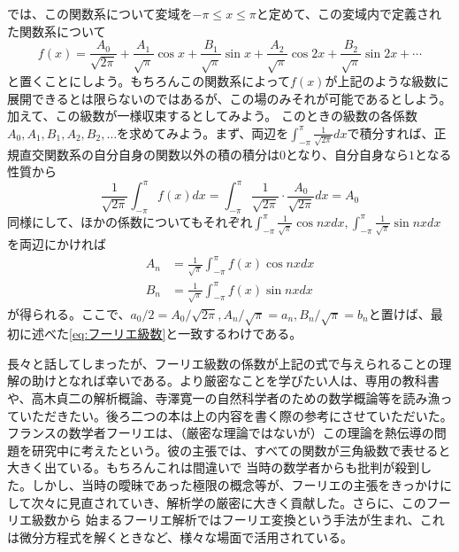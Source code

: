\documentclass[a4j,dvipdfmx]{jsarticle}
\begin{document}
                では、この関数系について変域を$-\pi\leq x\leq \pi$と定めて、この変域内で定義された関数系について
                \begin{equation*}
                    f(x)=\frac{A_0}{\sqrt{2\pi}}+\frac{A_1}{\sqrt{\pi}}\cos x+\frac{B_1}{\sqrt{\pi}}\sin x+\frac{A_2}{\sqrt{\pi}}\cos 2x+\frac{B_2}{\sqrt{\pi}}\sin 2x+\cdots
                \end{equation*}
                と置くことにしよう。もちろんこの関数系によって$f(x)$が上記のような級数に展開できるとは限らないのではあるが、この場のみそれが可能であるとしよう。加えて、この級数が一様収束するとしてみよう。
                このときの級数の各係数$A_0,A_1,B_1,A_2,B_2,\dots$を求めてみよう。まず、両辺を$\int_{-\pi}^{\pi}\frac{1}{\sqrt{2\pi}}dx$で積分すれば、正規直交関数系の自分自身の関数以外の積の積分は$0$となり、自分自身なら$1$となる性質から
                \begin{equation*}
                    \frac{1}{\sqrt{2\pi}}\int_{-\pi}^{\pi}f(x)dx = \int_{-\pi}^{\pi}\frac{1}{\sqrt{2\pi}}\cdot\frac{A_0}{\sqrt{2\pi}}dx = A_0
                \end{equation*}
                同様にして、ほかの係数についてもそれぞれ$\int_{-\pi}^{\pi}\frac{1}{\sqrt{\pi}}\cos nxdx,\int_{-\pi}^{\pi}\frac{1}{\sqrt{\pi}}\sin nxdx$を両辺にかければ
                \begin{align*}
                    A_n&=\frac{1}{\sqrt{\pi}}\int_{-\pi}^{\pi}f(x)\cos nxdx \\
                    B_n&=\frac{1}{\sqrt{\pi}}\int_{-\pi}^{\pi}f(x)\sin nxdx
                \end{align*}
                が得られる。ここで、$a_0/2 = A_0/\sqrt{2\pi},A_n/\sqrt{\pi}=a_n,B_n/\sqrt{\pi}=b_n$と置けば、最初に述べた\eqref{eq:フーリエ級数}と一致するわけである。

                長々と話してしまったが、フーリエ級数の係数が上記の式で与えられることの理解の助けとなれば幸いである。より厳密なことを学びたい人は、専用の教科書や、高木貞二の解析概論、寺澤寛一の自然科学者のための数学概論等を読み漁っていただきたい。後ろ二つの本は上の内容を書く際の参考にさせていただいた。\\

                フランスの数学者フーリエは、（厳密な理論ではないが）この理論を熱伝導の問題を研究中に考えたという。彼の主張では、すべての関数が三角級数で表せると大きく出ている。もちろんこれは間違いで
                当時の数学者からも批判が殺到した。しかし、当時の曖昧であった極限の概念等が、フーリエの主張をきっかけにして次々に見直されていき、解析学の厳密に大きく貢献した。さらに、このフーリエ級数から
                始まるフーリエ解析ではフーリエ変換という手法が生まれ、これは微分方程式を解くときなど、様々な場面で活用されている。
\end{document}
